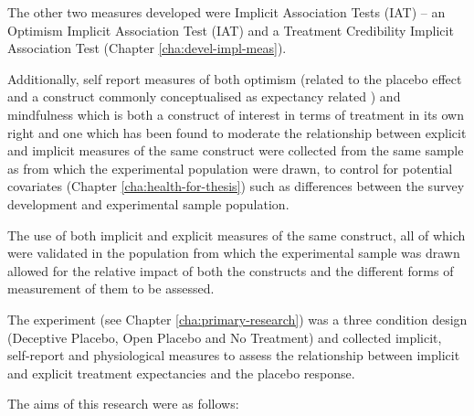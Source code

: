 The other two measures developed were Implicit Association Tests (IAT) -- an Optimism Implicit Association Test (IAT) and a Treatment Credibility Implicit Association Test (Chapter \ref{cha:devel-impl-meas}). 

Additionally, self report measures of both optimism (related to the placebo effect and a construct commonly conceptualised as expectancy related \cite{Carver2010}) and mindfulness which is both a construct of interest in terms of treatment in its own right \cite{kabat1982outpatient} and one which has been found to moderate the relationship between explicit and implicit measures of the same construct were collected from the same sample as from which the experimental population were drawn, to control for potential covariates (Chapter \ref{cha:health-for-thesis}) such as differences between the survey development and experimental sample population. 

The use of both implicit and explicit measures of the same construct, all of which were validated in the population from which the experimental sample was drawn allowed for the relative impact of both the constructs and the different forms of measurement of them to be assessed. 

The experiment (see Chapter \ref{cha:primary-research}) was a three condition design (Deceptive Placebo, Open Placebo and No Treatment) and collected implicit, self-report and physiological measures to assess the relationship between implicit and explicit treatment expectancies and the placebo response. 







The aims of this research were as follows:


